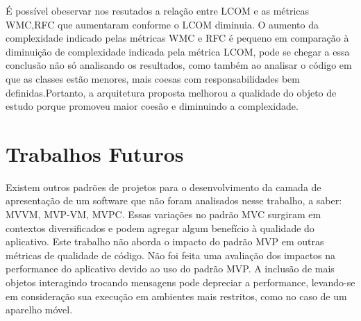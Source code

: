 É possível obeservar nos resutados a relação entre LCOM e as métricas 
WMC,RFC que aumentaram conforme o LCOM diminuia. O aumento da complexidade
indicado pelas métricas WMC e RFC é pequeno em comparação à diminuição de
complexidade indicada pela métrica LCOM, pode se chegar a essa conclusão não só
analisando os resultados, como também ao analisar o código em que as classes
estão menores, mais coesas com responsabilidades bem definidas.Portanto, a
arquitetura proposta melhorou a qualidade do objeto de estudo porque promoveu
maior coesão e diminuindo a complexidade.

 
\section{Trabalhos Futuros}

Existem outros padrões de projetos para o desenvolvimento da camada de
apresentação de um software que não foram analisados nesse trabalho, a saber: 
MVVM, MVP-VM, MVPC. Essas variações no padrão MVC surgiram em contextos
diversificados e podem agregar algum benefício à qualidade do aplicativo.
Este trabalho não aborda o impacto do padrão MVP em outras métricas de qualidade
de código.
Não foi feita uma avaliação dos impactos na performance do aplicativo devido ao
uso do padrão MVP. A inclusão de mais objetos interagindo trocando mensagens
pode depreciar a performance, levando-se em consideração sua execução em
ambientes mais restritos, como no caso de um aparelho móvel.